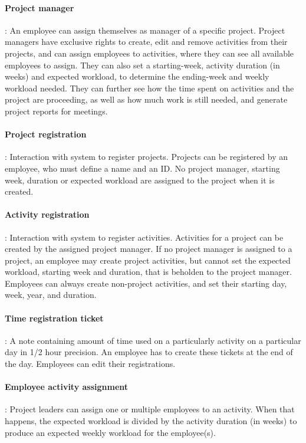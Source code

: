 \paragraph{Project manager}: An employee can assign themselves as manager of a specific project. Project managers have exclusive rights to create, edit and remove activities from their projects, and can assign employees to activities, where they can see all available employees to assign. They can also set a starting-week, activity duration (in weeks) and expected workload, to determine the ending-week and weekly workload needed. They can further see how the time spent on activities and the project are proceeding, as well as how much work is still needed, and generate project reports for meetings.
\paragraph{Project registration}: Interaction with system to register projects. Projects can be registered by an employee, who must define a name and an ID. No project manager, starting week, duration or expected workload are assigned to the project when it is created.
\paragraph{Activity registration}: Interaction with system to register activities. Activities for a project can be created by the assigned project manager. If no project manager is assigned to a project, an employee may create project activities, but cannot set the expected workload, starting week and duration, that is beholden to the project manager. Employees can always create non-project activities, and set their starting day, week, year, and duration.
\paragraph{Time registration ticket}:  A note containing amount of time used on a particularly activity on a particular day in 1/2 hour precision. An employee has to create these tickets at the end of the day. Employees can edit their registrations.
\paragraph{Employee activity assignment}: Project leaders can assign one or multiple employees to an activity. When that happens, the expected workload is divided by the activity duration (in weeks) to produce an expected weekly workload for the employee(s).
